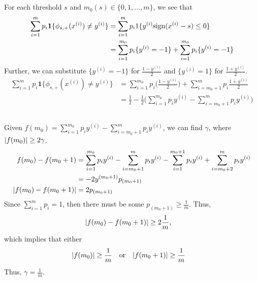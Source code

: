 \documentclass[11pt,a4paper,titlepage]{article}
\begin{document}
\section{}{
\subsection{}{
\quad For each threshold $s$ and $m_0(s)\in \{0, 1, \ldots, m\}$, we see that 
\begin{align*}
	\sum_{i=1}^{m} p_i \textbf{1}\{\phi_{s,+}(x^{(i)}) \neq y^{(i)}\} &= \sum_{i=1}^{m} p_i 1\{y^{(i)} \textnormal{sign}(x^{(i)} - s) \leq 0 \}
    \\ &= \sum_{i=1}^{m_0} p_i \{y^{(i)}=-1\} + \sum_{i=1}^{m_0} p_i \{y^{(i)}=-1\} 
\end{align*}
Further, we can substitute $\{y^{(i)}=-1\}$ for $\frac{1-y^{(i)}}{2}$ and $\{y^{(i)}=1\}$ for $\frac{1+y^{(i)}}{2}$.
\begin{align*}
	\sum_{i=1}^{m} p_i \textbf{1}\{\phi_{s,+}(x^{(i)}) \neq y^{(i)}\} &= \sum_{i=1}^{m_0} p_i \bigg(\frac{1-y^{(i)}}{2}\bigg) + \sum_{i=m_0+1}^{m} p_i \frac{1+y^{(i)}}{2}
    \\ &= \frac{1}{2} - \frac{1}{2} \Bigg(\sum_{i=1}^{m_0} p_i y^{(i)} - \sum_{i=m_0+1}^{m} p_i y^{(i)}\Bigg)
\end{align*}
}\label{prob:6a}
\subsection{}{
\quad Given $f(m_0) = \sum_{i=1}^{m_0} p_i y^{(i)} - \sum_{i=m_0+1}^{m} p_i y^{(i)}$, we can find $\gamma$, where $\abs{f(m_0)} \geq 2\gamma$.
\begin{align*}
	f(m_0) - f(m_0 + 1) &= \sum_{i=1}^{m_0} p_i y^{(i)} - \sum_{i=m_0+1}^{m} p_i y^{(i)} - \sum_{i=1}^{m_0+1} p_i y^{(i)} + \sum_{i=m_0+2}^{m} p_i y^{(i)}
    \\ &= -2y^{(m_0+1)}p_{(m_0+1)}
    \\ \abs{f(m_0) - f(m_0 + 1)} &= 2p_{(m_0+1)}
\end{align*}
Since $\sum_{i=1}^m p_i = 1$, then there must be some $p_{(m_0+1)} \geq \frac{1}{m}$. Thus,
\begin{align*}
	\abs{f(m_0) - f(m_0 + 1)} &\geq 2\frac{1}{m},
\end{align*}
which implies that either
\begin{align*}
	\abs{f(m_0)} &\geq \frac{1}{m} \quad \textnormal{or} \quad \abs{f(m_0+1)} \geq \frac{1}{m}
\end{align*}
Thus, $\gamma = \frac{1}{m}$.
}\label{prob:6b}
}
\end{document}
